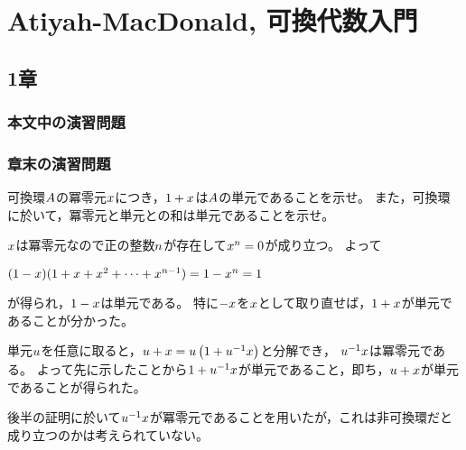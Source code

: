 \section{Atiyah-MacDonald, 可換代数入門}

\subsection{1章}
\subsubsection{本文中の演習問題}
\subsubsection{章末の演習問題}
\begin{exercise}
    可換環\(\CommutativeRing\)の冪零元\(\Element\)につき，\(1+\Element\)は\(\CommutativeRing\)の単元であることを示せ。
    また，可換環に於いて，冪零元と単元との和は単元であることを示せ。
\end{exercise}
\begin{answer}
    \(\Element\)は冪零元なので正の整数\(\NaturalNumber\)が存在して\(\Element^{\NaturalNumber}=0\)が成り立つ。
    よって
    \begin{center}
        \((1-\Element)(1+\Element+\Element^2+\cdots+\Element^{n-1})=1-\Element^{n}=1\)
    \end{center}
    が得られ，\(1-\Element\)は単元である。
    特に\(-\Element\)を\(\Element\)として取り直せば，\(1+\Element\)が単元であることが分かった。

    単元\(\Element<u>\)を任意に取ると，\(\Element<u>+\Element=\Element<u>(1+\Element<u>\Inv\Element)\)と分解でき，
    \(\Element<u>\Inv\Element\)は冪零元である。
    よって先に示したことから\(1+\Element<u>\Inv\Element\)が単元であること，即ち，\(\Element<u>+\Element\)が単元であることが得られた。
\end{answer}
\begin{remark}
    後半の証明に於いて\(\Element<u>\Inv\Element\)が冪零元であることを用いたが，これは非可換環だと成り立つのかは考えられていない。
\end{remark}
